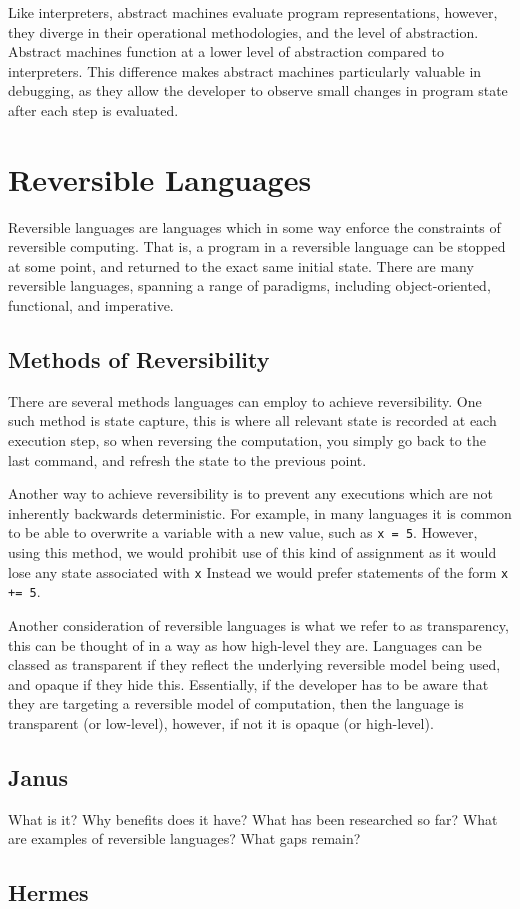 Like interpreters, abstract machines evaluate program representations, however, they diverge in their operational methodologies, and the level of abstraction\cite{AbstractMachine, AbstractMachineForLanguage}. Abstract machines function at a lower level of abstraction compared to interpreters. This difference makes abstract machines particularly valuable in debugging, as they allow the developer to observe small changes in program state after each step is evaluated.

\section{Reversible Languages}

Reversible languages are languages which in some way enforce the constraints of reversible computing. That is, a program in a reversible language can be stopped at some point, and returned to the exact same initial state. There are many reversible languages, spanning a range of paradigms, including object-oriented, functional, and imperative\cite{Janus, RFun, ROOP}.

\subsection{Methods of Reversibility}

There are several methods languages can employ to achieve reversibility. One such method is state capture, this is where all relevant state is recorded at each execution step, so when reversing the computation, you simply go back to the last command, and refresh the state to the previous point.

Another way to achieve reversibility is to prevent any executions which are not inherently backwards deterministic. For example, in many languages it is common to be able to overwrite a variable with a new value, such as \lstinline{x = 5}. However, using this method, we would prohibit use of this kind of assignment as it would lose any state associated with \lstinline{x} Instead we would prefer statements of the form \lstinline{x += 5}\cite{ReversibleTaxonomy}.

Another consideration of reversible languages is what we refer to as transparency, this can be thought of in a way as how high-level they are. Languages can be classed as transparent if they reflect the underlying reversible model being used, and opaque if they hide this. Essentially, if the developer has to be aware that they are targeting a reversible model of computation, then the language is transparent (or low-level), however, if not it is opaque (or high-level).


\subsection{Janus}

What is it?
Why benefits does it have?
What has been researched so far?
What are examples of reversible languages?
What gaps remain?

\subsection{Hermes}

\subsection{\rimplang}
